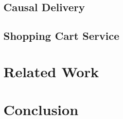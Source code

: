 \documentclass{vldb}
\begin{document}
\subsection{Causal Delivery}

\subsection{Shopping Cart Service}

\section{Related Work}

\section{Conclusion}



\end{document}
